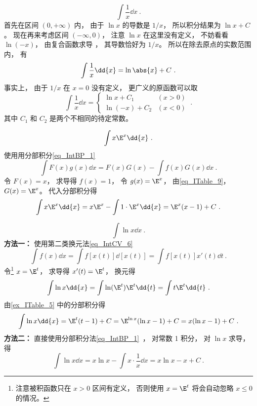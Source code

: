 \begin{example}{}\label{ex_ITable_11}
\begin{equation}
\int \frac1x \dd{x}~.
\end{equation}
首先在区间 $(0,+\infty)$ 内， 由于 $\ln x$ 的导数是 $1/x$， 所以积分结果为 $\ln x + C$。 现在再来考虑区间 $(-\infty, 0)$， 注意 $\ln x$ 在这里没有定义， 不妨看看 $\ln(-x)$， 由复合函数求导%
， 其导数恰好为 $1/x$。 所以在除去原点的实数范围内， 有
\begin{equation}
\int \frac1x \dd{x} = \ln\abs{x} + C~.
\end{equation}
事实上， 由于 $1/x$ 在 $x=0$ 没有定义， 更广义的原函数可以取
\begin{equation}
\int \frac1x \dd{x} =
\begin{cases}
\ln x + C_1 & (x > 0)\\
\ln (-x) + C_2 & (x < 0)
\end{cases}~.
\end{equation}
其中 $C_1$ 和 $C_2$ 是两个不相同的待定常数。
\end{example}

\begin{example}{}\label{ex_ITable_5}
\begin{equation}
\int x\E^x \dd{x}~.
\end{equation}
使用用分部积分\autoref{eq_IntBP_1}~
\begin{equation}
\int F(x)g(x) \dd{x}  = F(x)G(x) - \int f(x)G(x) \dd{x}~.
\end{equation}
令 $F(x) = x$， 求导得 $f(x) = 1$， 令 $g(x) = \E^x$， 由\autoref{eq_ITable_9}， $G(x) = \E^x$。 代入分部积分得
\begin{equation}
\int x\E^x \dd{x} = x\E^x - \int 1\cdot \E^x \dd{x} = \E^x(x - 1) + C~.
\end{equation}
\end{example}

\begin{example}{}\label{ex_ITable_6}
\begin{equation}
\int \ln x \dd{x}~.
\end{equation}
\textbf{方法一：} 使用第二类换元法\autoref{eq_IntCV_6}~
\begin{equation}
\int f(x) \dd{x} = \int f[x(t)] \dd{[x(t)]} = \int f[x(t)]x'(t) \dd{t}~.
\end{equation}
令\footnote{注意被积函数只在 $x>0$ 区间有定义， 否则使用 $x = \E^t$ 将会自动忽略 $x\leqslant 0$ 的情况。} $x = \E^t$， 求导得 $x'(t) = \E^t$， 换元得
\begin{equation}
\int \ln x \dd{x} = \int \ln(\E^t) \E^t  \dd{t} = \int t \E^t  \dd{t}~.
\end{equation}
由\autoref{ex_ITable_5} 中的分部积分得
\begin{equation}
\int \ln x \dd{x} = \E^t (t-1) + C = \E^{\ln x} (\ln x -1) + C = x (\ln x-1) + C~.
\end{equation}
\textbf{方法二：} 直接使用分部积分法\autoref{eq_IntBP_1}~， 对常数 1 积分， 对 $\ln x$ 求导， 得
\begin{equation}
\int \ln x \dd{x} = x\ln x - \int x\cdot \frac1x \dd{x} = x\ln x - x + C~.
\end{equation}
\end{example}

